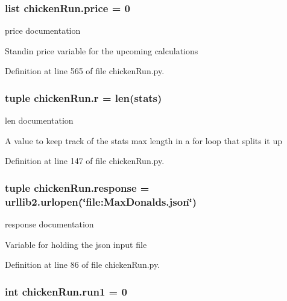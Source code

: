 \hypertarget{namespacechickenRun_aedf71c4915e00269c3427e59db0d1f89}{
\subsubsection[{price}]{\setlength{\rightskip}{0pt plus 5cm}list chicken\-Run.\-price = 0}}\label{namespacechickenRun_aedf71c4915e00269c3427e59db0d1f89}


price documentation 

Standin price variable for the upcoming calculations 

Definition at line 565 of file chicken\-Run.\-py.

\hypertarget{namespacechickenRun_aee6d9c4cb512eabfb7516015f442d9b7}{
\subsubsection[{r}]{\setlength{\rightskip}{0pt plus 5cm}tuple chicken\-Run.\-r = len({\bf stats})}}\label{namespacechickenRun_aee6d9c4cb512eabfb7516015f442d9b7}


len documentation 

A value to keep track of the stats max length in a for loop that splits it up 

Definition at line 147 of file chicken\-Run.\-py.

\hypertarget{namespacechickenRun_a7088dc28e687a12474d1912e15b4a98b}{
\subsubsection[{response}]{\setlength{\rightskip}{0pt plus 5cm}tuple chicken\-Run.\-response = urllib2.\-urlopen(\char`\"{}file\-:\-Max\-Donalds.\-json\char`\"{})}}\label{namespacechickenRun_a7088dc28e687a12474d1912e15b4a98b}


response documentation 

Variable for holding the json input file 

Definition at line 86 of file chicken\-Run.\-py.

\hypertarget{namespacechickenRun_a22bcabf490b73682d4f29f4082a390f5}{
\subsubsection[{run1}]{\setlength{\rightskip}{0pt plus 5cm}int chicken\-Run.\-run1 = 0}}\label{namespacechickenRun_a22bcabf490b73682d4f29f4082a390f5}


